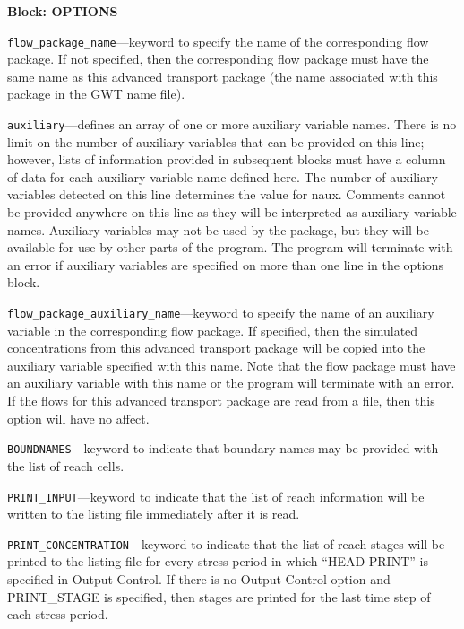 
\item \textbf{Block: OPTIONS}

\begin{description}
\item \texttt{flow\_package\_name}---keyword to specify the name of the corresponding flow package.  If not specified, then the corresponding flow package must have the same name as this advanced transport package (the name associated with this package in the GWT name file).

\item \texttt{auxiliary}---defines an array of one or more auxiliary variable names.  There is no limit on the number of auxiliary variables that can be provided on this line; however, lists of information provided in subsequent blocks must have a column of data for each auxiliary variable name defined here.   The number of auxiliary variables detected on this line determines the value for naux.  Comments cannot be provided anywhere on this line as they will be interpreted as auxiliary variable names.  Auxiliary variables may not be used by the package, but they will be available for use by other parts of the program.  The program will terminate with an error if auxiliary variables are specified on more than one line in the options block.

\item \texttt{flow\_package\_auxiliary\_name}---keyword to specify the name of an auxiliary variable in the corresponding flow package.  If specified, then the simulated concentrations from this advanced transport package will be copied into the auxiliary variable specified with this name.  Note that the flow package must have an auxiliary variable with this name or the program will terminate with an error.  If the flows for this advanced transport package are read from a file, then this option will have no affect.

\item \texttt{BOUNDNAMES}---keyword to indicate that boundary names may be provided with the list of reach cells.

\item \texttt{PRINT\_INPUT}---keyword to indicate that the list of reach information will be written to the listing file immediately after it is read.

\item \texttt{PRINT\_CONCENTRATION}---keyword to indicate that the list of reach stages will be printed to the listing file for every stress period in which ``HEAD PRINT'' is specified in Output Control.  If there is no Output Control option and PRINT\_STAGE is specified, then stages are printed for the last time step of each stress period.


\end{description}
